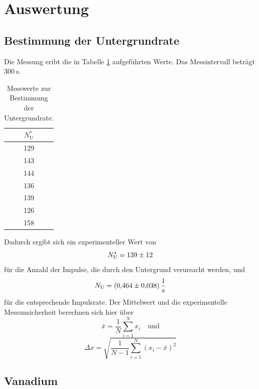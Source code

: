 \section{Auswertung}
\label{sec:Auswertung}

\subsection{Bestimmung der Untergrundrate}

Die Messung eribt die in Tabelle \ref{tab:Untergrundrate} aufgeführten Werte. Das Messintervall beträgt $\SI{300}{\second}$. 
\begin{table}
    \centering
    \caption{Messwerte zur Bestimmung der Untergrundrate.}
    \label{tab:Untergrundrate}
    \begin{tabular}{c}
        \toprule
        $N^*_\text{U}$ \\
        \midrule
        129 \\
        143 \\
        144 \\
        136 \\
        139 \\ 
        126 \\
        158 \\
        \bottomrule
    \end{tabular}
\end{table}
Dadurch ergibt sich ein experimenteller Wert von 
\begin{equation*}
    N^*_\text{U}=\num{139+-12}
\end{equation*}
für die Anzahl der Impulse, die durch den Untergrund verursacht werden, und 
\begin{equation}
    N_\text{U}=\SI{0.464+-0.038}{\per\second}
    \label{eqn:Untergrund}
\end{equation}
für die entsprechende Impulsrate.
Der Mittelwert und die experimentelle Messunsicherheit berechnen sich hier über 
\begin{equation*}
    \bar{x}=\frac{1}{N}\sum_{i=1}^N x_i \quad \text{und}
\end{equation*}
\begin{equation*}
    \Delta x = \sqrt{\frac{1}{N-1} \sum_{i=1}^N (x_i-\bar{x})^2}
\end{equation*}

\subsection{Vanadium}

